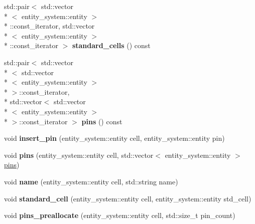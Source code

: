 \begin{DoxyCompactItemize}
\item 
\hypertarget{classophidian_1_1netlist_1_1cells_ae55a61ba3696d886b53b9e2343f79f65}{std\-::pair$<$ std\-::vector\\*
$<$ entity\-\_\-system\-::entity $>$\\*
\-::const\-\_\-iterator, std\-::vector\\*
$<$ entity\-\_\-system\-::entity $>$\\*
\-::const\-\_\-iterator $>$ {\bfseries standard\-\_\-cells} () const }\label{classophidian_1_1netlist_1_1cells_ae55a61ba3696d886b53b9e2343f79f65}

\item 
\hypertarget{classophidian_1_1netlist_1_1cells_ae4c2aab27683c09698bec84edd555784}{std\-::pair$<$ std\-::vector\\*
$<$ std\-::vector\\*
$<$ entity\-\_\-system\-::entity $>$\\*
 $>$\-::const\-\_\-iterator, \\*
std\-::vector$<$ std\-::vector\\*
$<$ entity\-\_\-system\-::entity $>$\\*
 $>$\-::const\-\_\-iterator $>$ {\bfseries pins} () const }\label{classophidian_1_1netlist_1_1cells_ae4c2aab27683c09698bec84edd555784}

\item 
\hypertarget{classophidian_1_1netlist_1_1cells_a684f35d6149199d3c57fb9b5c5e58351}{void {\bfseries insert\-\_\-pin} (entity\-\_\-system\-::entity cell, entity\-\_\-system\-::entity pin)}\label{classophidian_1_1netlist_1_1cells_a684f35d6149199d3c57fb9b5c5e58351}

\item 
\hypertarget{classophidian_1_1netlist_1_1cells_a194ea5266847f10fe1531ccbfe4460ff}{void {\bfseries pins} (entity\-\_\-system\-::entity cell, std\-::vector$<$ entity\-\_\-system\-::entity $>$ \hyperlink{classophidian_1_1netlist_1_1pins}{pins})}\label{classophidian_1_1netlist_1_1cells_a194ea5266847f10fe1531ccbfe4460ff}

\item 
\hypertarget{classophidian_1_1netlist_1_1cells_af7cd4fbceb61cf0279d1e01c060efc34}{void {\bfseries name} (entity\-\_\-system\-::entity cell, std\-::string name)}\label{classophidian_1_1netlist_1_1cells_af7cd4fbceb61cf0279d1e01c060efc34}

\item 
\hypertarget{classophidian_1_1netlist_1_1cells_a8d22b2b65253373cc3cdd0c65b43e58d}{void {\bfseries standard\-\_\-cell} (entity\-\_\-system\-::entity cell, entity\-\_\-system\-::entity std\-\_\-cell)}\label{classophidian_1_1netlist_1_1cells_a8d22b2b65253373cc3cdd0c65b43e58d}

\item 
\hypertarget{classophidian_1_1netlist_1_1cells_ae1e606ed21a9d738468c60a1c0cef136}{void {\bfseries pins\-\_\-preallocate} (entity\-\_\-system\-::entity cell, std\-::size\-\_\-t pin\-\_\-count)}\label{classophidian_1_1netlist_1_1cells_ae1e606ed21a9d738468c60a1c0cef136}

\end{DoxyCompactItemize}


